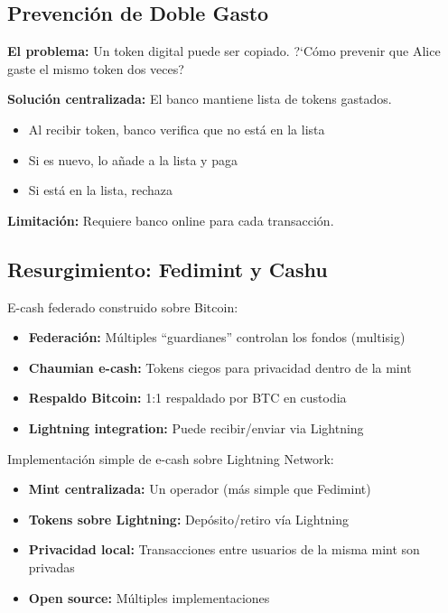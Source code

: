 \documentclass[11pt,a4paper,twoside]{book}
\begin{document}
\subsection{Prevenci\'on de Doble Gasto}

\begin{remark}
\textbf{El problema:} Un token digital puede ser copiado. ?`C\'omo prevenir que Alice gaste el mismo token dos veces?

\textbf{Soluci\'on centralizada:} El banco mantiene lista de tokens gastados.
\begin{itemize}
    \item Al recibir token, banco verifica que no est\'a en la lista
    \item Si es nuevo, lo a\~nade a la lista y paga
    \item Si est\'a en la lista, rechaza
\end{itemize}

\textbf{Limitaci\'on:} Requiere banco online para cada transacci\'on.
\end{remark}

\subsection{Resurgimiento: Fedimint y Cashu}

\begin{definition}[Fedimint]
E-cash federado construido sobre Bitcoin:
\begin{itemize}
    \item \textbf{Federaci\'on:} M\'ultiples ``guardianes'' controlan los fondos (multisig)
    \item \textbf{Chaumian e-cash:} Tokens ciegos para privacidad dentro de la mint
    \item \textbf{Respaldo Bitcoin:} 1:1 respaldado por BTC en custodia
    \item \textbf{Lightning integration:} Puede recibir/enviar via Lightning
\end{itemize}
\end{definition}

\begin{definition}[Cashu]
Implementaci\'on simple de e-cash sobre Lightning Network:
\begin{itemize}
    \item \textbf{Mint centralizada:} Un operador (m\'as simple que Fedimint)
    \item \textbf{Tokens sobre Lightning:} Dep\'osito/retiro v\'ia Lightning
    \item \textbf{Privacidad local:} Transacciones entre usuarios de la misma mint son privadas
    \item \textbf{Open source:} M\'ultiples implementaciones
\end{itemize}
\end{definition}
\end{document}
